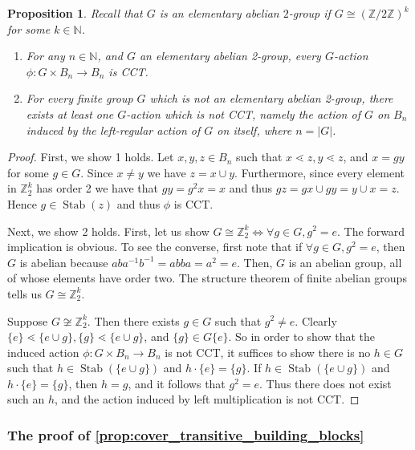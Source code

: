 \documentclass[smallextended, envcountsame, numbook]{svjour3}
\theoremstyle{plain}
\newtheorem{prop}[thm]{Proposition}
\theoremstyle{definition}
\theoremstyle{remark}
\numberwithin{equation}{section}
\newcommand\sssec{\subsubsection}
\renewcommand{\iff}{\Leftrightarrow}
\newcommand\Stab{\operatorname{Stab}}
\begin{document}
\begin{prop}
\label{prop:regular_action_CCT}
Recall that $G$ is an elementary abelian $2$-group if $G \cong (\mathbb Z/2\mathbb Z)^k$ for some $k \in \mathbb N$.
\begin{enumerate}
  \item For any $n \in \mathbb N$, and $G$ an elementary abelian 2-group, every $G$-action $\phi:G \times B_n \rightarrow B_n$ is CCT.
  \item For every finite group $G$ which is not an elementary abelian 2-group, there exists at least one $G$-action which is not CCT, namely the action of $G$ on $B_n$ induced by the left-regular action of $G$ on itself, where $n = |G|$.
\end{enumerate}
\end{prop}

\begin{proof}
First, we show 1 holds. Let $x,y,z\in B_n$ such that $x \lessdot z, y \lessdot z$, and  $x = gy$ for some $g\in G$.  Since $x\ne y$ we have $z=x\cup y$.  Furthermore, since every element in $\mathbb Z_2^k$ has order 2 we have that $gy = g^2x = x$ and thus $gz = gx\cup gy = y\cup x = z$. Hence $g\in\Stab(z)$ and thus $\phi$ is CCT.

Next, we show 2 holds. First, let us show $G \cong \mathbb Z_2^k \iff \forall g \in G,g^2 = e$. The forward implication is obvious. To see the converse, first note that if $\forall g \in G, g^2 = e$, then $G$ is abelian because $aba^{-1}b^{-1} = abba = a^2 = e$.  Then, $G$ is an abelian group, all of whose elements have order two. The structure theorem of finite abelian groups tells us $G \cong \mathbb Z_2^k$.

Suppose $G \not \cong \mathbb Z_2^k$. Then there exists $g \in G$ such that $g^2 \neq e$. Clearly $\{e\}\lessdot \{e \cup g\},\{g\} \lessdot \{e \cup g\}$, and $\{g\} \in G\{e\}$. So in order to show that the induced action $\phi\colon G \times B_n \rightarrow B_n$ is not CCT, it suffices to show there is no $h \in G$ such that $h \in \Stab(\{e \cup g\})$ and $h\cdot \{e\} =\{g\}$.  If $h \in \Stab(\{e \cup g\})$ and $h \cdot \{e\} = \{g\}$, then $h = g$, and it follows that $g^2 = e$.  Thus there does not exist such an $h$, and the action induced by left multiplication is not CCT.
\end{proof}

\sssec{The proof of \ref{prop:cover_transitive_building_blocks}}
\label{sssec:dihedral}\indent 
\end{document}
